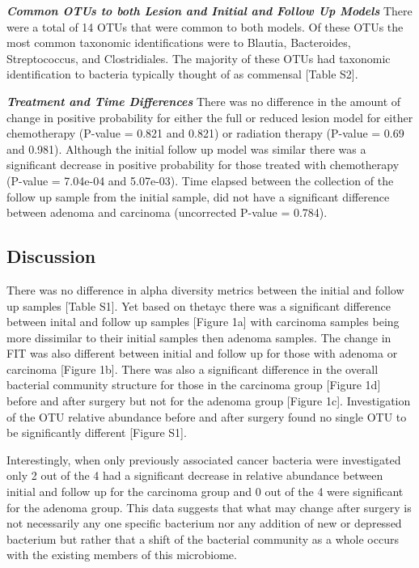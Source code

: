 \documentclass[12pt,]{article}
\begin{document}
\textbf{\emph{Common OTUs to both Lesion and Initial and Follow Up
Models}} There were a total of 14 OTUs that were common to both models.
Of these OTUs the most common taxonomic identifications were to Blautia,
Bacteroides, Streptococcus, and Clostridiales. The majority of these
OTUs had taxonomic identification to bacteria typically thought of as
commensal {[}Table S2{]}.

\textbf{\emph{Treatment and Time Differences}} There was no difference
in the amount of change in positive probability for either the full or
reduced lesion model for either chemotherapy (P-value = 0.821 and 0.821)
or radiation therapy (P-value = 0.69 and 0.981). Although the initial
follow up model was similar there was a significant decrease in positive
probability for those treated with chemotherapy (P-value = 7.04e-04 and
5.07e-03). Time elapsed between the collection of the follow up sample
from the initial sample, did not have a significant difference between
adenoma and carcinoma (uncorrected P-value = 0.784).

\newpage

\subsection{Discussion}\label{discussion}

There was no difference in alpha diversity metrics between the initial
and follow up samples {[}Table S1{]}. Yet based on thetayc there was a
significant difference between inital and follow up samples {[}Figure
1a{]} with carcinoma samples being more dissimilar to their initial
samples then adenoma samples. The change in FIT was also different
between initial and follow up for those with adenoma or carcinoma
{[}Figure 1b{]}. There was also a significant difference in the overall
bacterial community structure for those in the carcinoma group {[}Figure
1d{]} before and after surgery but not for the adenoma group {[}Figure
1c{]}. Investigation of the OTU relative abundance before and after
surgery found no single OTU to be significantly different {[}Figure
S1{]}.

Interestingly, when only previously associated cancer bacteria were
investigated only 2 out of the 4 had a significant decrease in relative
abundance between initial and follow up for the carcinoma group and 0
out of the 4 were significant for the adenoma group. This data suggests
that what may change after surgery is not necessarily any one specific
bacterium nor any addition of new or depressed bacterium but rather that
a shift of the bacterial community as a whole occurs with the existing
members of this microbiome.
\end{document}
